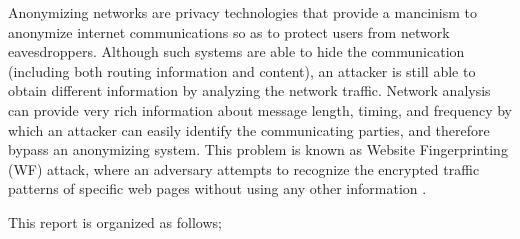 Anonymizing networks are privacy technologies that provide a mancinism to anonymize internet communications so as to protect users from network eavesdroppers. Although such systems are able to hide the communication (including both routing information and content), an attacker is still able to obtain different information by analyzing the network traffic. Network analysis can provide very rich information about message length, timing, and frequency by which an attacker can easily identify the communicating parties, and therefore bypass an anonymizing system. This problem is known as Website Fingerprinting (WF) attack, where an adversary attempts to recognize the encrypted traffic patterns of specific web pages without using any other information \cite{juarez14, murdoch2005low}.



This report is organized as follows; %
